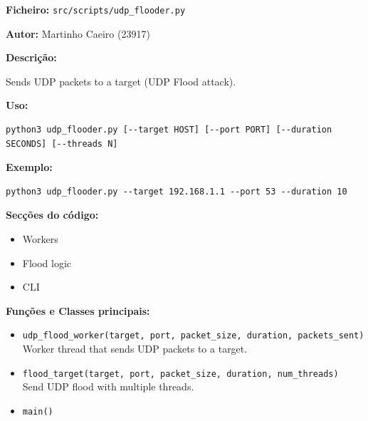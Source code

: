 \documentclass[a4paper,11pt]{article}
\begin{document}
\textbf{Ficheiro:} \texttt{src/scripts/udp\_flooder.py}

\textbf{Autor:} Martinho Caeiro (23917)

\textbf{Descrição:}

Sends UDP packets to a target (UDP Flood attack).

\textbf{Uso:}
\begin{verbatim}
python3 udp_flooder.py [--target HOST] [--port PORT] [--duration SECONDS] [--threads N]
\end{verbatim}

\textbf{Exemplo:}
\begin{verbatim}
python3 udp_flooder.py --target 192.168.1.1 --port 53 --duration 10
\end{verbatim}

\textbf{Secções do código:}
\begin{itemize}
    \item Workers
    \item Flood logic
    \item CLI
\end{itemize}

\textbf{Funções e Classes principais:}
\begin{itemize}
    \item \texttt{udp\_flood\_worker(target, port, packet\_size, duration, packets\_sent)}
    \\ Worker thread that sends UDP packets to a target.
    \item \texttt{flood\_target(target, port, packet\_size, duration, num\_threads)}
    \\ Send UDP flood with multiple threads.
    \item \texttt{main()}
\end{itemize}

\newpage
\end{document}
